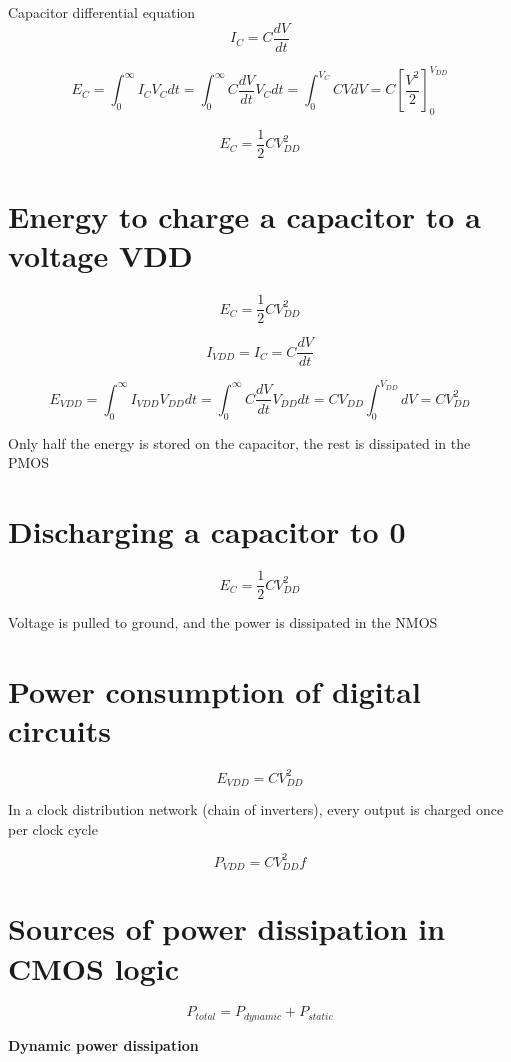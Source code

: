 Capacitor differential equation \[ I_C = C\frac{dV}{dt}\]

\[E_{C}  = \int_0^\infty{I_C V_C dt} = \int_0^\infty{ C \frac{dV}{dt} V_C dt} = \int_0^{V_C}{C V dV} = C\left[\frac{V^2}{2}\right]_0^{V_{DD}} \]

\[E_{C} = \frac{1}{2} C V_{DD}^2\]

\section{Energy to charge a capacitor to a voltage
VDD}\label{energy-to-charge-a-capacitor-to-a-voltage-vdd}

\[E_{C} = \frac{1}{2} C V_{DD}^2\]

\[I_{VDD} = I_C = C \frac{dV}{dt}\]

\[E_{VDD} = \int_0^\infty{I_{VDD} V_{DD} dt} = \int_0^\infty{C \frac{dV}{dt} V_{DD} dt} = C V_{DD}\int_0^{V_{DD}}{dV} = C V_{DD}^2\]

Only half the energy is stored on the capacitor, the rest is dissipated
in the PMOS

\section{Discharging a capacitor to
0}\label{discharging-a-capacitor-to-0}

\[E_{C} = \frac{1}{2} C V_{DD}^2\]

Voltage is pulled to ground, and the power is dissipated in the NMOS

\section{Power consumption of digital
circuits}\label{power-consumption-of-digital-circuits}

\[E_{VDD} = C V_{DD}^2\]

In a clock distribution network (chain of inverters), every output is
charged once per clock cycle

\[P_{VDD} = C V_{DD}^2 f\]

\section{Sources of power dissipation in CMOS
logic}\label{sources-of-power-dissipation-in-cmos-logic}

\[P_{total} = P_{dynamic} + P_{static}\]

\textbf{Dynamic power dissipation}

